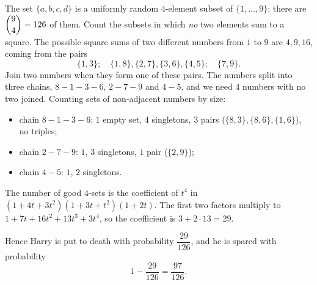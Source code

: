 The set $\{a,b,c,d\}$ is a uniformly random $4$-element subset of $\{1,\dots,9\}$; there are $\dbinom94=126$ of them. Count the subsets in which \emph{no} two elements sum to a square. The possible square sums of two different numbers from $1$ to $9$ are $4,9,16$, coming from the pairs
\[
\{1,3\};\quad \{1,8\},\{2,7\},\{3,6\},\{4,5\};\quad \{7,9\}.
\]
Join two numbers when they form one of these pairs. The numbers split into three chains, $8-1-3-6$, $2-7-9$ and $4-5$, and we need $4$ numbers with no two joined. Counting sets of non-adjacent numbers by size:
\begin{itemize}
\item chain $8-1-3-6$: $1$ empty set, $4$ singletons, $3$ pairs ($\{8,3\},\{8,6\},\{1,6\}$), no triples;
\item chain $2-7-9$: $1$, $3$ singletons, $1$ pair ($\{2,9\}$);
\item chain $4-5$: $1$, $2$ singletons.
\end{itemize}
The number of good $4$-sets is the coefficient of $t^4$ in $(1+4t+3t^2)(1+3t+t^2)(1+2t)$. The first two factors multiply to $1+7t+16t^2+13t^3+3t^4$, so the coefficient is $3+2\cdot13=29$.

Hence Harry is put to death with probability $\dfrac{29}{126}$, and he is spared with probability
\[
1-\dfrac{29}{126}=\boxed{\dfrac{97}{126}}.
\]
